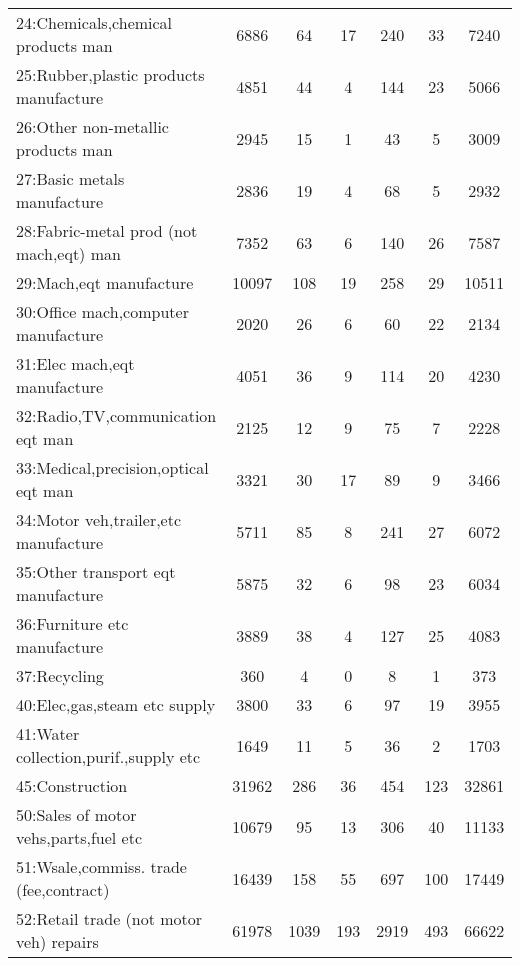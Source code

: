 {\begin{longtable}{l*{6}{c}}
24:Chemicals,chemical products man&     6886&       64&       17&      240&       33&     7240\\
25:Rubber,plastic products manufacture&     4851&       44&        4&      144&       23&     5066\\
26:Other non-metallic products man&     2945&       15&        1&       43&        5&     3009\\
27:Basic metals manufacture&     2836&       19&        4&       68&        5&     2932\\
28:Fabric-metal prod (not mach,eqt) man&     7352&       63&        6&      140&       26&     7587\\
29:Mach,eqt manufacture&    10097&      108&       19&      258&       29&    10511\\
30:Office mach,computer manufacture&     2020&       26&        6&       60&       22&     2134\\
31:Elec mach,eqt manufacture&     4051&       36&        9&      114&       20&     4230\\
32:Radio,TV,communication eqt man&     2125&       12&        9&       75&        7&     2228\\
33:Medical,precision,optical eqt man&     3321&       30&       17&       89&        9&     3466\\
34:Motor veh,trailer,etc manufacture&     5711&       85&        8&      241&       27&     6072\\
35:Other transport eqt manufacture&     5875&       32&        6&       98&       23&     6034\\
36:Furniture etc manufacture&     3889&       38&        4&      127&       25&     4083\\
37:Recycling&      360&        4&        0&        8&        1&      373\\
40:Elec,gas,steam etc supply&     3800&       33&        6&       97&       19&     3955\\
41:Water collection,purif.,supply etc&     1649&       11&        5&       36&        2&     1703\\
45:Construction&    31962&      286&       36&      454&      123&    32861\\
50:Sales of motor vehs,parts,fuel etc&    10679&       95&       13&      306&       40&    11133\\
51:Wsale,commiss. trade (fee,contract)&    16439&      158&       55&      697&      100&    17449\\
52:Retail trade (not motor veh) repairs&    61978&     1039&      193&     2919&      493&    66622\\

\end{longtable}}
